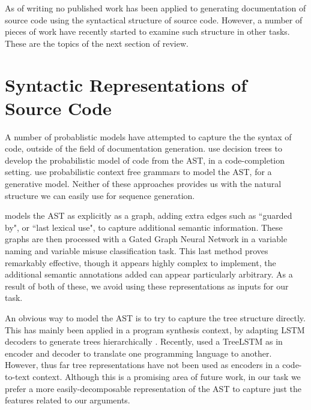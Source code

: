 
As of writing no published work has been applied to generating documentation of source code using the syntactical structure of source code.  However, a number of pieces of work have recently started to examine such structure in other tasks. These are the topics of the next section of review.

\section{Syntactic Representations of Source Code}

A number of probablistic models have attempted to capture the the syntax of code, outside of the field of documentation generation.
\citet{raychev_probabilistic_nodate} use decision trees to develop the probabilistic model of code from the AST, in a code-completion setting. 
\citet{maddison_structured_2014} use probabilistic context free grammars to model the AST, for a generative model. 
Neither of these approaches provides us with the natural structure we can easily use for sequence generation. 

\citet{allamanis_learning_2017} models the AST as explicitly as a graph, adding extra edges such as ``guarded by", or ``last lexical use", to capture additional semantic information. These graphs are then processed with a Gated Graph Neural Network \citep{gated-graph-sequence-neural-networks} in a variable naming and variable misuse classification task. 
This last method proves remarkably effective, though it appears highly complex to implement, the additional semantic annotations added can appear particularly arbitrary. As a result of both of these, we avoid using these representations as inputs for our task.

An obvious way to model the AST is to try to capture the tree structure directly. This has mainly been applied in a program synthesis context, by adapting LSTM decoders to generate trees hierarchically \citep{dong_language_2016,yin_syntactic_2017}. Recently, \citet{chen_tree--tree_2018} used a TreeLSTM  \citep{tai_improved_2015} as in encoder and decoder to translate one programming language to another. However, thus far tree representations have not been used as encoders in a code-to-text context. Although this is a promising area of future work, in our task we prefer a more easily-decomposable representation of the AST to capture just the features related to our arguments.

